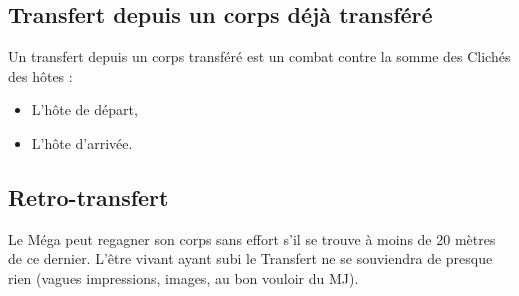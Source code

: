 \documentclass[11pt]{article}
\begin{document}
\subsection{Transfert depuis un corps déjà transféré}

Un transfert depuis un corps transféré est un combat contre la somme des Clichés des hôtes :
\begin{itemize}
\item L'hôte de départ,
\item L'hôte d'arrivée.
\end{itemize}

\subsection{Retro-transfert}

Le Méga peut regagner son corps sans effort s'il se trouve à moins de 20 mètres de ce dernier. L'être vivant ayant subi le Transfert ne se souviendra de presque rien (vagues impressions, images, au bon vouloir du MJ).
\end{document}
